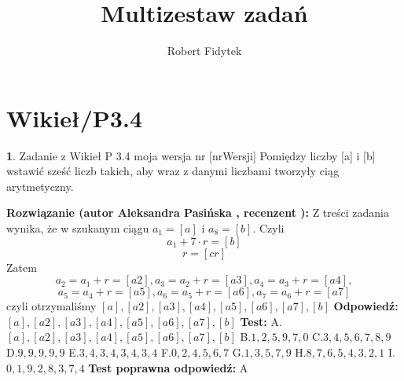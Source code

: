 \documentclass[12pt, a4paper]{article}
\title{Multizestaw zadań}
\author{Robert Fidytek}
\date{}
\theoremstyle{definition} %
\newtheorem{zad}{}
\newcommand{\kategoria}[1]{\section{#1}} %
\newcommand{\zadStart}[1]{\begin{zad}#1\newline} %
\newcommand{\zadStop}{\end{zad}}   %
\newcommand{\rozwStart}[2]{\noindent \textbf{Rozwiązanie (autor #1 , recenzent #2): }\newline} %
\newcommand{\rozwStop}{\newline}                                            %
\newcommand{\odpStart}{\noindent \textbf{Odpowiedź:}\newline}    %
\newcommand{\odpStop}{\newline}                                             %
\newcommand{\testStart}{\noindent \textbf{Test:}\newline} %
\newcommand{\testStop}{\newline} %
\newcommand{\kluczStart}{\noindent \textbf{Test poprawna odpowiedź:}\newline} %
\newcommand{\kluczStop}{\newline} %
\begin{document}
\maketitle


\kategoria{Wikieł/P3.4}
\zadStart{Zadanie z Wikieł P 3.4 moja wersja nr [nrWersji]}
Pomiędzy liczby [a] i [b] wstawić sześć liczb takich, aby wraz z danymi liczbami tworzyły ciąg arytmetyczny.
\zadStop
\rozwStart{Aleksandra Pasińska}{}
Z treści zadania wynika, że w szukanym ciągu $a_{1}=[a]$ i $a_{8}=[b]$. Czyli 
$$a_{1}+7\cdot r = [b]$$ 
$$r=[cr]$$
Zatem
$$a_{2}=a_{1}+r=[a2], a_{3}=a_{2}+r=[a3], a_{4}=a_{3}+r=[a4],$$ $$ a_{5}=a_{4}+r=[a5], a_{6}=a_{5}+r=[a6], a_{7}=a_{6}+r=[a7]$$
czyli otrzymaliśmy $[a],[a2],[a3],[a4],[a5],[a6],[a7],[b]$
\rozwStop
\odpStart
$[a],[a2],[a3],[a4],[a5],[a6],[a7],[b]$
\odpStop
\testStart
A.$[a],[a2],[a3],[a4],[a5],[a6],[a7],[b]$
B.$1,2,5,9,7,0$
C.$3,4,5,6,7,8,9$
D.$9,9,9,9,9$
E.$3,4,3,4,3,4,3,4$
F.$0,2,4,5,6,7$
G.$1,3,5,7,9$
H.$8,7,6,5,4,3,2,1$
I.$0,1,9,2,8,3,7,4$
\testStop
\kluczStart
A
\kluczStop
\end{document}
